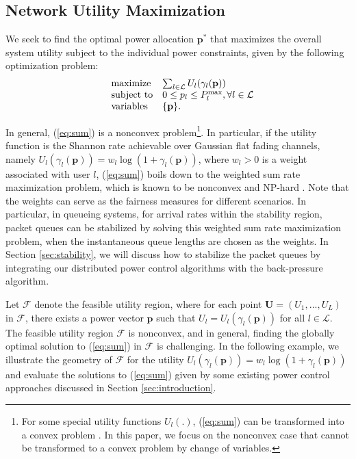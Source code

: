 \documentclass[10pt,journal,letterpaper,compsoc]{IEEEtran}
\begin{document}
\subsection{Network Utility Maximization}
We seek to find the optimal power allocation $\mathbf{p}^*$ that maximizes the overall system utility subject to the individual power constraints, given by the following optimization problem:
\begin{equation}\begin{array}
[c]{lll}&{\text{maximize} }&\sum_{l\in\mathcal{L}}U_l(\gamma_l(\mathbf{p}))
\\
&\text{subject to}& 0\leq p_l\leq P_l^{\max}, \forall l\in\mathcal{L}
\\
& \text{variables}& \{\mathbf{p}\}.
\end{array}
\label{eq:sum}
\end{equation}

In general, (\ref{eq:sum}) is a nonconvex problem\footnote{For some special utility functions $U_l(.)$, (\ref{eq:sum}) can be transformed into a convex problem \cite{chiang:2007}. In this paper, we focus on the nonconvex case that cannot be transformed to a convex problem by change of variables.}. In particular, if the utility function is the Shannon rate achievable over Gaussian flat fading channels, namely  $U_l(\gamma_l(\mathbf{p}))=w_l\log(1+\gamma_l(\mathbf{p}))$, where $w_l>0$ is a weight associated with user $l$, (\ref{eq:sum}) boils down to the weighted sum rate maximization problem, which is known to be nonconvex and NP-hard \cite{luo:2008}. Note that the weights can serve as the fairness measures\cite{mo:2000} for different scenarios. In particular, in queueing systems, for arrival rates within the stability region, packet queues can be stabilized by solving this weighted sum rate maximization problem, when the instantaneous queue lengths are chosen as the weights. In Section \ref{sec:stability}, we will discuss how to stabilize the packet queues by integrating our distributed power control algorithms with the back-pressure algorithm.

Let $\mathcal{F}$ denote the feasible utility region, where for each point $\mathbf{U}=(U_1,...,U_L)$ in $\mathcal{F}$, there exists a power vector $\mathbf{p}$ such that $U_l=U_l(\gamma_l(\mathbf{p}))$ for all $l\in\mathcal{L}$. The feasible utility region $\mathcal{F}$ is nonconvex, and in general, finding the globally optimal solution to (\ref{eq:sum}) in $\mathcal{F}$ is challenging. In the following example, we illustrate the geometry of $\mathcal{F}$ for the utility $U_l(\gamma_l(\mathbf{p}))=w_l\log(1+\gamma_l(\mathbf{p}))$ and evaluate the solutions to (\ref{eq:sum}) given by some existing power control approaches discussed in Section \ref{sec:introduction}.
\end{document}
